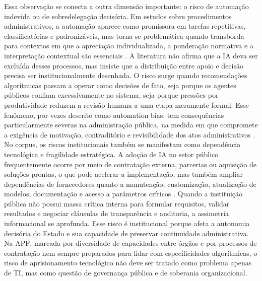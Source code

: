 \documentclass[12pt,a4paper]{article}
\begin{document}
Essa observação se conecta a outra dimensão importante: o risco de automação indevida ou de sobredelegação decisória. Em estudos sobre procedimentos administrativos, a automação aparece como promissora em tarefas repetitivas, classificatórias e padronizáveis, mas torna-se problemática quando transborda para contextos em que a apreciação individualizada, a ponderação normativa e a interpretação contextual são essenciais \autocite{parycek2023artificial}. A literatura não afirma que a IA deva ser excluída desses processos, mas insiste que a distribuição entre apoio e decisão precisa ser institucionalmente desenhada. O risco surge quando recomendações algorítmicas passam a operar como decisões de fato, seja porque os agentes públicos confiam excessivamente no sistema, seja porque pressões por produtividade reduzem a revisão humana a uma etapa meramente formal. Esse fenômeno, por vezes descrito como automation bias, tem consequências particularmente severas na administração pública, na medida em que compromete a exigência de motivação, contraditório e revisibilidade dos atos administrativos \autocite{pi2021machine} \autocite{serra2024a}.
No corpus, os riscos institucionais também se manifestam como dependência tecnológica e fragilidade estratégica. A adoção de IA no setor público frequentemente ocorre por meio de contratação externa, parcerias ou aquisição de soluções prontas, o que pode acelerar a implementação, mas também ampliar dependências de fornecedores quanto a manutenção, customização, atualização de modelos, documentação e acesso a parâmetros críticos \autocite{yiitcanlar2022artificial} \autocite{david2023understanding}. Quando a instituição pública não possui massa crítica interna para formular requisitos, validar resultados e negociar cláusulas de transparência e auditoria, a assimetria informacional se aprofunda. Esse risco é institucional porque afeta a autonomia decisória do Estado e sua capacidade de preservar continuidade administrativa. Na APF, marcada por diversidade de capacidades entre órgãos e por processos de contratação nem sempre preparados para lidar com especificidades algorítmicas, o risco de aprisionamento tecnológico não deve ser tratado como problema apenas de TI, mas como questão de governança pública e de soberania organizacional.
\end{document}

